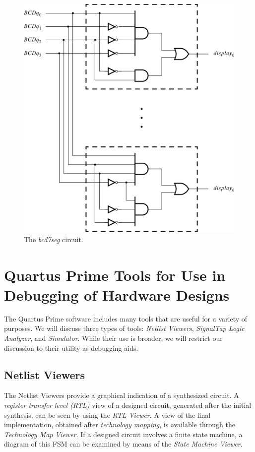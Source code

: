 \documentclass[11pt, twoside, pdftex]{article}
\begin{document}
\begin{figure}[H]
   \begin{center}
      \includegraphics[scale=1]{figures/figure13.png}
   \caption{The {\it bcd7seg} circuit.} 
	 \label{fig:13}
	 \end{center}
\end{figure}

\section{Quartus\textsuperscript{\textregistered} Prime Tools for Use in Debugging of Hardware Designs}
The Quartus Prime software includes many tools that are useful for a variety
of purposes. We will discuss three types of tools: {\it Netlist Viewers},
{\it SignalTap Logic Analyzer}, and {\it Simulator}. 
While their use is broader, we will restrict
our discussion to their utility as debugging aids.

\subsection{Netlist Viewers}
The Netlist Viewers provide a graphical indication of a synthesized circuit.
A {\it register transfer level (RTL)} view of a designed circuit, generated after the
initial synthesis, can be seen by using the {\it RTL Viewer}. A view of the final 
implementation, obtained after {\it technology mapping}, is available through the
{\it Technology Map Viewer}. If a designed circuit involves a finite state machine,
a diagram of this FSM can be examined by means of the {\it State Machine Viewer}.
\end{document}
